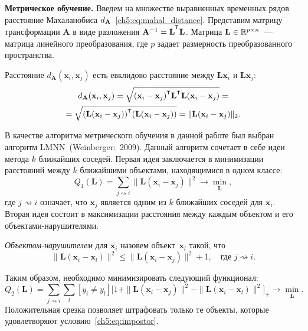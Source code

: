 \documentclass[11pt, a5paper]{dissert}
\begin{document}
\textbf{Метрическое обучение.}
Введем на множестве выравненных временных рядов расстояние Махаланобиса $d_{\mathbf{A}}$~\ref{ch5:eq:mahal_distance}.
Представим матрицу трансформации $\mathbf{A}$ в виде разложения $\mathbf{A}^{-1} = \mathbf{L}^{\T}  \mathbf{L}$.
Матрица $\mathbf{L} \in \mathbb{R}^{p \times n}$~--- матрица линейного преобразования, где $p$ задает размерность преобразованного пространства. 

Расстояние $d_\mathbf{A} (\mathbf{x}_i, \mathbf{x}_j)$ есть евклидово расстояние между $\mathbf{Lx}_i$ и $\mathbf{Lx}_j$:
\begin{multline*}
	d_\mathbf{A} (\mathbf{x}_i, \mathbf{x}_j) = \sqrt{(\mathbf{x}_i - \mathbf{x}_j)^{\T} \mathbf{L}^{\T} \mathbf{L} (\mathbf{x}_i - \mathbf{x}_j)} = \\= \sqrt{(\mathbf{L} (\mathbf{x}_i - \mathbf{x}_j))^{\T} (\mathbf{L} (\mathbf{x}_i - \mathbf{x}_j))} = \|\mathbf{L} (\mathbf{x}_i - \mathbf{x}_j)\|_2.
\end{multline*}

В качестве алгоритма метрического обучения в данной работе был выбран алгоритм LMNN~(Weinberger:~2009). 
Данный алгоритм сочетает в себе идеи метода $k$ ближайших соседей. 
Первая идея заключается в минимизации расстояний между $k$ ближайшими объектами, находящимися в одном классе:
\[
	Q_1(\mathbf{L}) = \sum_{j \rightsquigarrow i} \|\mathbf{L}(\mathbf{x}_i - \mathbf{x}_j)\|^2 \rightarrow \min_{\mathbf{L}},
\]
где $j \rightsquigarrow i$ означает, что $\mathbf{x}_j$ является одним из $k$ ближайших соседей для $\mathbf{x}_i$.
Вторая идея состоит в максимизации расстояния между каждым объектом и его объектами-нарушителями. 
\begin{definition}
	\textit{Объектом-нарушителем} для $\mathbf{x}_i$ назовем объект~$\mathbf{x}_l$ такой, что
	\begin{equation}
		\label{ch5:eq:impostor}
		\|\mathbf{L}(\mathbf{x}_i - \mathbf{x}_l)\|^2 \leq \|\mathbf{L}(\mathbf{x}_i - \mathbf{x}_j)\|^2 + 1, \quad \text{где $j \rightsquigarrow i$}.
	\end{equation}
\end{definition}
Таким образом, необходимо минимизировать следующий функционал:
\[
	Q_2(\mathbf{L}) = \sum_{j \rightsquigarrow i} \sum_l [y_i \neq y_l] \bigl[1 + \|\mathbf{L}(\mathbf{x}_i - \mathbf{x}_j)\|^2 - \|\mathbf{L}(\mathbf{x}_i - \mathbf{x}_l)\|^2\bigr]_+ \rightarrow \min_{\mathbf{L}}.
\]
Положительная срезка позволяет штрафовать только те объекты, которые удовлетворяют условию~\eqref{ch5:eq:impostor}.
\end{document}
